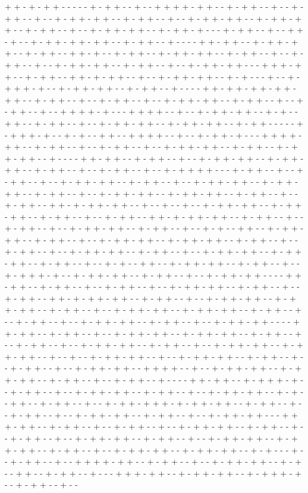 + + - + - + + - - - - - + - + + - - + - - + + + + - + + - - + - + + - - + - - + - + + - - + - - + - + + - + + - - + - + + - - + - - + - + + - + + - - + - + + - + + - - + - + + - - + - - + - + + - + + - - + - + + - + - - - + - + + - - + - - + + - + - - + - + + - + + - + + - - + - + + - - + - - - - + + - + + - - + - + + - + + - - + - + + - - + + - + - - + - + + - - + - + + - + + - - + - + + - - + - - + - + + - - + - - + - + + - + + - - + - + + - - + - - + - + + - + + - - - + + + - + + - - + - + + - - + + - + - + + - - + - - + - + + - + + - - + - + - - - + - - + - + + + - + - - + - + + - + + - - + - + + - - + - - - - + + - + + - + + - + + - + + - - + - + + - - + - - + - + + - - + - - + - + + - + + - - + - + + - - + - - + - + + - - + - - + + + + - + - - - + + + + - - + - - + - + + - + + - - + - + - - + + - - + - + + - - + - - + - + + - + + - - + - + + - + + - - + - + + - - - - - + - + + + - + - - + - + - - + + - - + + + + - - + - - + - + + - + - - - + + + + - + + - - + - + + - - + - - + - + + - - + - - + - + + - + + - - + - + + - - + - + + - + + - - + - - - - + + - + + - - + - + + - - + - - + - + + - + + - - + - + + - + + - - + - + + - - + - - + - + + - - + - - + - + + + + - - - + - + + - - + - - + - + + - - + - - + - + + - + + - - + - + + - - + - - + - + + - + + - - + - + + - + + - - + - + + - - + - - + - + + - + + - - + - + + - + + - - + - + + - - + - - + - + + - - + + - + - + + - + + - - + - - + - - + - - + - + + - + + - - + - + + - + + - - + - + + - - + - - + - + + - - + + - + - + + - + + - - + - + + - - + - - + - + + - - + - - + - + + - + + - - + - + + - - + - - + - + - - + + - - + - + + - + + - - + - + + - - + - - + - + + - + + - - + - + + - + + - - + - + + - - + - - + - + + - - + - - + - + + - + + - - + - + + - - + - - + - + + - + + - - + - + + - + + - - + - + + - - + - - + - + - - + + - - + - + + - + + - - + - + + - - + - - + - + + + - + - - + - + + - + + - - + - + + - - + - - + - + + - + + - - - - + + - + + - - + - + + - - + - - + - + + - - + - - + - + + - + + - - + - + + - - + - - + - + + - - + + - + - + + - + + - - + - + + - - + - - + - + + - + + - - + - + + - + + - - + - + + - - + - - + - + + - + + - - + - + + - + + - - + - + + - - + - - + - + + - - + - - + - + + - + + - - + - + + - - + - - + - + + - + + - - - - + + - + + - - + - + + - - + - - + - + + - + + - - + - + + - + + - - + - + + - - + - - + - + + - - + - - + - + + - + + - - + - + + - - + - - + - + + - + + - - + - + + - + + - - + - - + - - + - + + - + + - - + - - + - + + - + + - - + - + + - - + - - + - + + - - + - - + - + + - + + - - + + + + - - + - - + - + + - + + - - + - + + - + + - - + - + + - - + - - + - + + - - + - - - - + + - + + - - + - + + + - + - - + - + + - - + - - + - + + - + + - - + - + + - - + - - + - + + - + + - - + - + - - + + - - + - + + - - + - - + - + + - + + + - + - + + - + + - - + - + + - - + - - + - + + - - + - - + - + + - + + - - + - + + - - + - - + - + + - + + - - - + + + - + + - - + - + + - - + - - + - + + - - + - - + - + + - + + - - + - + + - - + - - + - + + - - + - - + - + + - + + - - + - + + - - + - - + - + + - + + - - + - + + - + + - - + - + + - - + - - + - + + - + + - - + - + + - + + - - + - + - - - + - - + - + + - - + - - + + + + - + + - - + - + + - - + - - + - + + - + + - - + - + - - + + - - + - + + - - + - - - + + + - + + - - + - + + - + + - - + - + + + - + - - + - + + - - + - - 